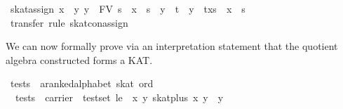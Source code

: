 \documentclass{llncs}
\begin{document}
\begin{isabellebody}
\isanewline
{}\isamarkupfalse%
\ skat{}assign{}{}\ {}{}x\ {}\ y{}\ y\ {}\ FV\ s{}\ {}\ {}x\ {}{}\ s\ {}\ y\ {}{}\ t{}\ {}\ {}y\ {}{}\ t{}x{}s{}\ {}\ x\ {}{}\ s{}{}\isanewline
%
\isadelimproof
\ \ %
\endisadelimproof
%
\isatagproof
{}\isamarkupfalse%
\ {}transfer{}\ rule\ skat{}con{}assign{}{}%
\endisatagproof\isanewline
\end{isabellebody}

We can now formally prove via an interpretation statement that the quotient algebra constructed forms a KAT.

\begin{isabellebody}
\isanewline
{}\isamarkupfalse%
\ tests\ {}{}\ {}{}a{}{}ranked{}alphabet\ skat\ ord{}\ \isanewline
\ \ {}tests\ {}\ {}carrier\ {}\ test{}set{}\ le\ {}\ {}{}x\ y{}\ skat{}plus\ x\ y\ {}\ y{}{}{}\isanewline
\end{isabellebody}
\end{document}
